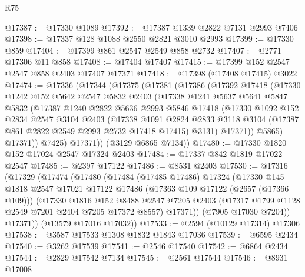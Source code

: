 \begin{lexlean}{R75}
\begin{coremodule}
@17387 := @17330 @1089
@17392 := @17387 @1339 @2822 @7131 @2993 @7406
@17398 := @17337 @128 @1088 @2550 @2821 @3010 @2993
@17399 := @17330 @859
@17404 := @17399 @861 @2547 @2549 @858 @2732
@17407 := @2771 @17306 @11 @858
@17408 := @17404 @17407
@17415 := @17399 @152 @2547 @2547 @858 @2403 @17407 @17371
@17418 := @17398 (@17408 @17415) @3022
@17474 := @17336
    (@17344
      (@17375
        (@17381
          (@17386
            (@17392
              @17418
              (@17330
                @1242
                @152
                @5642
                @2547
                @5832
                @2403
                (@17338
                  @1241
                  @5637
                  @5641
                  @5847
                  @5832
                  (@17387
                    @1240
                    @2822
                    @5636
                    @2993
                    @5846
                    @17418
                    (@17330
                      @1092
                      @152
                      @2834
                      @2547
                      @3104
                      @2403
                      (@17338
                        @1091
                        @2824
                        @2833
                        @3118
                        @3104
                        (@17387 @861 @2822 @2549 @2993 @2732 @17418 @17415)
                        @3131)
                      @17371))
                  @5865)
                @17371))
            @7425)
          @17371))
      (@3129 @6865 @7134))
@17480 := @17330 @1820 @152 @17024 @2547 @17324 @2403
@17484 := @17337 @842 @1819 @17022 @2547
@17485 := @2397 @17122
@17486 := @8531 @2403
@17530 := @17316
    (@17329
      (@17474
        (@17480
          (@17484
            (@17485 @17486)
            @17324
            (@17330
              @145
              @1818
              @2547
              @17021
              @17122
              @17486
              (@17363 @109 @17122 (@2657 (@17366 @109)))
              (@17330
                @1816
                @152
                @8488
                @2547
                @7205
                @2403
                (@17317 @1799 @1128 @2549 @7201 @2404 @7205 @17372 @8557)
                @17371))
            (@7905 @17030 @7204))
          @17371))
      (@13579 @17016 @17032))
@17533 := @2594 (@10129 @17314) @17306
@17538 := @3587 @17533 @1308 @1832 @1843 @17036
@17539 := @6595 @2434
@17540 := @3262 @17539
@17541 := @2546 @17540
@17542 := @6864 @2434
@17544 := @2829 @17542 @7134
@17545 := @2561 @17544
@17546 := @8931 @17008

\end{coremodule}
\end{lexlean}
